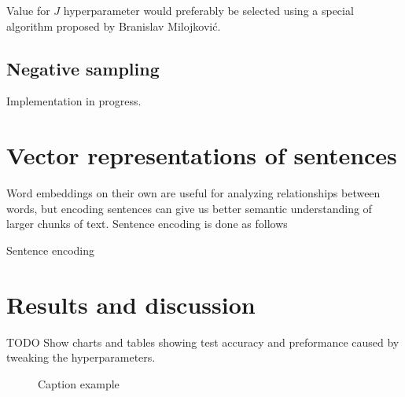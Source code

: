 \documentclass{article}
\newcommand{\SetAlgoStyle}{
	\SetAlgoNoLine
	\SetAlgoNoEnd
	\DontPrintSemicolon
}
\newcommand{\fig}[2]{
	\begin{figure}[!htb]
		\center{\texttt{[image: res/\#1]}}
		\caption{\label{fig:caption} #2}
	\end{figure}
}
\begin{document}
\medbreak

Value for $J$ hyperparameter would preferably be selected using a
special algorithm proposed by Branislav Milojković.

\subsection{Negative sampling}

Implementation in progress.

\section{Vector representations of sentences}

Word embeddings on their own are useful for analyzing relationships between
words, but encoding sentences can give us better semantic understanding of
larger chunks of text. Sentence encoding is done as follows

\begin{algorithm}[H]
	\SetAlgoStyle
	\caption{Sentence encoding}
\end{algorithm}

\section{Results and discussion}

TODO Show charts and tables showing test accuracy and preformance caused by
tweaking the hyperparameters.

\fig{chart}{Caption example}
\end{document}
